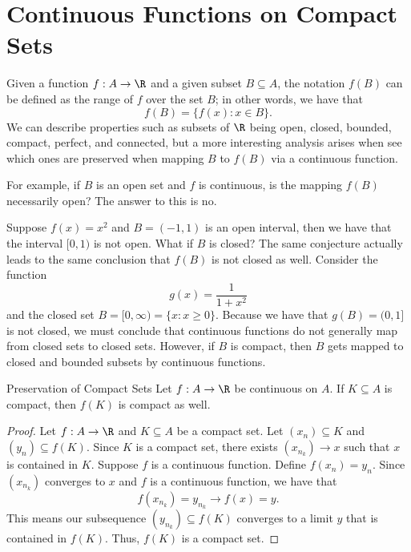 

\section{Continuous Functions on Compact Sets}

Given a function \( f: A \to \R  \) and a given subset \( B \subseteq A  \), the notation \( f(B) \) can be defined as the range of \( f \) over the set \( B  \); in other words, we have that 
\[  f(B) = \{ f(x) : x \in B  \}.  \]
We can describe properties such as subsets of \( \R  \) being open, closed, bounded, compact, perfect, and connected, but a more interesting analysis arises when see which ones are preserved when mapping \( B  \) to \( f(B) \) via a continuous function. 

For example, if \( B  \) is an open set and \( f \) is continuous, is the mapping \( f(B) \) necessarily open? The answer to this is no.  

Suppose \( f(x) =x^2  \) and \( B = (-1,1) \) is an open interval, then we have that the interval \( [0,1) \) is not open. What if \( B  \) is closed? The same conjecture actually leads to the same conclusion that \( f(B) \) is not closed as well. Consider the function
\[  g(x) = \frac{ 1 }{ 1 + x^2  }   \]
and the closed set \( B = [0, \infty ) = \{ x : x \geq 0  \}  \). Because we have that \( g(B) = (0,1] \) is not closed, we must conclude that continuous functions do not generally map from closed sets to closed sets. However, if \( B  \) is compact, then \( B  \) gets mapped to closed and bounded subsets by continuous functions.

    \begin{theorem}{Preservation of Compact Sets}{}
    Let \( f: A \to \R  \) be continuous on \( A  \). If \( K \subseteq A  \) is compact, then \( f(K)  \) is compact as well.
    \end{theorem}

\begin{proof}
    Let \(  f: A \to \R  \) and \( K \subseteq A  \) be a compact set. Let \( (x_n) \subseteq K \) and \( (y_n) \subseteq f(K) \). Since \( K  \) is a compact set, there exists \( (x_{n_k}) \to x  \) such that \( x  \) is contained in \( K  \). Suppose \( f  \) is a continuous function. Define \( f(x_n) = y_n \). Since \( (x_{n_k}) \) converges to \( x  \) and \( f  \) is a continuous function, we have that 
    \[  f(x_{n_k}) = y_{n_k} \to f(x) = y. \]
    This means our subsequence \( (y_{n_k}) \subseteq f(K) \) converges to a limit \( y \) that is contained in \( f(K) \). Thus, \( f(K)  \) is a compact set.
\end{proof}

